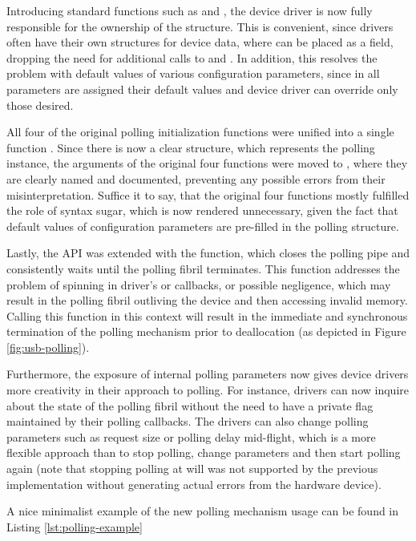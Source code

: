 Introducing standard functions such as  and
, the device driver is now fully responsible for the
ownership of the structure. This is convenient, since drivers often have their
own structures for device data, where  can be placed as a
field, dropping the need for additional calls to  and
. In addition, this resolves the problem with default values of
various configuration parameters, since in  all
parameters are assigned their default values and device driver can override only
those desired.

All four of the original polling initialization functions were unified into a
single function . Since there is now a clear structure,
which represents the polling instance, the arguments of the original four
functions were moved to , where they are clearly named and
documented, preventing any possible errors from their misinterpretation. Suffice
it to say, that the original four functions mostly fulfilled the role of syntax
sugar, which is now rendered unnecessary, given the fact that default values of
configuration parameters are pre-filled in the polling structure.

Lastly, the API was extended with the  function, which
closes the polling pipe and consistently waits until the polling fibril
terminates. This function addresses the problem of spinning in driver's
 or  callbacks, or possible negligence,
which may result in the polling fibril outliving the device and then accessing
invalid memory. Calling this function in this context will result in the
immediate and synchronous termination of the polling mechanism prior to
deallocation (as depicted in Figure \ref{fig:usb-polling}).

Furthermore, the exposure of internal polling parameters now gives device
drivers more creativity in their approach to polling. For instance, drivers can
now inquire about the state of the polling fibril without the need to have a
private flag maintained by their polling callbacks. The drivers can also change
polling parameters such as request size or polling delay mid-flight, which is a
more flexible approach than to stop polling, change parameters and then start
polling again (note that stopping polling at will was not supported by the
previous implementation without generating actual errors from the hardware
device).

A nice minimalist example of the new polling mechanism usage can be found in
Listing \ref{lst:polling-example}

